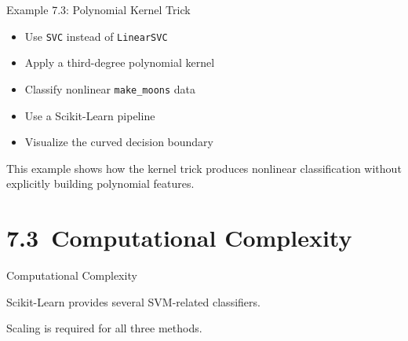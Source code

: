 \documentclass[aspectratio=169]{beamer}
\begin{document}

\begin{frame}{Example 7.3: Polynomial Kernel Trick}

\begin{itemize}
\item Use \texttt{SVC} instead of \texttt{LinearSVC}
\item Apply a third-degree polynomial kernel
\item Classify nonlinear \texttt{make\_moons} data
\item Use a Scikit-Learn pipeline
\item Visualize the curved decision boundary
\end{itemize}

\vspace{0.5em}

This example shows how the kernel trick produces nonlinear classification without explicitly building polynomial features.

\end{frame}


\section{7.3~Computational Complexity}
\begin{frame}{Computational Complexity}

Scikit-Learn provides several SVM-related classifiers.

\vspace{0.5em}

\begin{center}
\end{center}

\vspace{0.5em}

Scaling is required for all three methods.

\end{frame}
\end{document}
